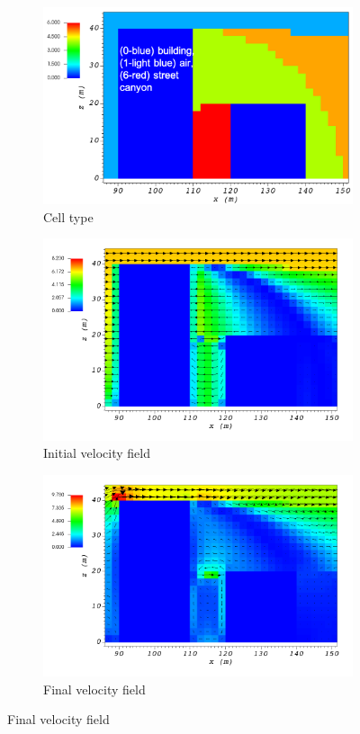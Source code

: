 \documentclass[14pt,landscape]{report}
\begin{document}
\begin{figure}[p]
    \centering
    \begin{subfigure}[t]{0.45\textwidth}
    \centering
    \includegraphics[width=10.3cm,keepaspectratio]{Images/street_y_100_1_init_icell.png}
    \caption{Cell type}
    \end{subfigure}
    \begin{subfigure}[t]{0.45\textwidth}
    \centering
    \includegraphics[width=11.0cm,keepaspectratio]{Images/street_y_100_1_init_vel.png}
    \caption{Initial velocity field}
    \end{subfigure}
    \begin{subfigure}[t]{0.45\textwidth}
    \centering
    \includegraphics[width=11.0cm,keepaspectratio]{Images/street_y_100_1_final.png}
    \caption{Final velocity field}
    \end{subfigure}
\end{figure}
\end{document}
